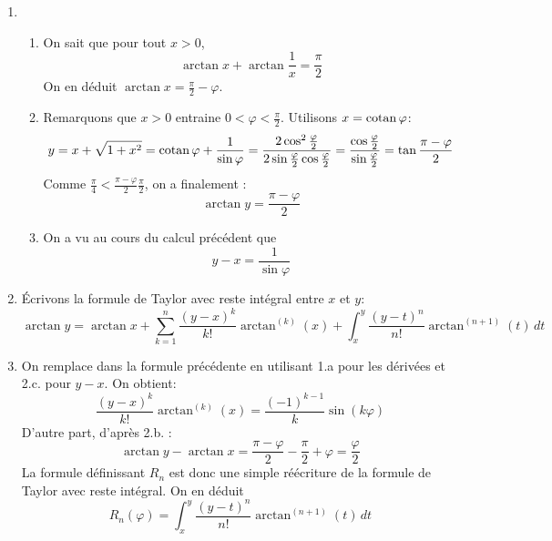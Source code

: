 \begin{enumerate}
\begin{enumerate}
\end{enumerate}
 \item 
\begin{enumerate}
 \item On sait que pour tout $x>0$,
\begin{displaymath}
 \arctan x + \arctan\frac{1}{x}=\frac{\pi}{2}
\end{displaymath}
On en déduit $\arctan x = \frac{\pi}{2}-\varphi$. 
 \item Remarquons que $x>0$ entraine $0< \varphi<\frac{\pi}{2}$. Utilisons $x=\operatorname{cotan} \varphi$:
\begin{displaymath}
 y = x+\sqrt{1+x^2}=\operatorname{cotan} \varphi + \frac{1}{\sin \varphi}
=\frac{2\cos^2\frac{\varphi}{2}}{2\sin\frac{\varphi}{2}\cos\frac{\varphi}{2}}
=\frac{\cos\frac{\varphi}{2}}{\sin\frac{\varphi}{2}}
=\tan \frac{\pi-\varphi}{2}
\end{displaymath}
Comme $\frac{\pi}{4}<\frac{\pi-\varphi}{2}\frac{\pi}{2}$, on a finalement :
\begin{displaymath}
 \arctan y = \frac{\pi-\varphi}{2}
\end{displaymath}

 \item On a vu au cours du calcul précédent que
\begin{displaymath}
 y-x = \frac{1}{\sin \varphi}
\end{displaymath}

\end{enumerate}
  \item \'Ecrivons la formule de Taylor avec reste intégral entre $x$ et $y$:
\begin{displaymath}
 \arctan y = \arctan x + \sum_{k=1}^n \frac{(y-x)^k}{k!}\arctan^{(k)}(x) + \int_x^y\frac{(y-t)^n}{n!}\arctan^{(n+1)}(t)\,dt
\end{displaymath}
 \item On remplace dans la formule précédente en utilisant 1.a pour les dérivées et 2.c. pour $y-x$. On obtient:
\begin{displaymath}
 \frac{(y-x)^k}{k!}\arctan^{(k)}(x)=\frac{(-1)^{k-1}}{k}\sin (k\varphi)
\end{displaymath}
D'autre part, d'après 2.b. :
\begin{displaymath}
 \arctan y - \arctan x= \frac{\pi - \varphi}{2}-\frac{\pi}{2}+\varphi=\frac{\varphi}{2}
\end{displaymath}
La formule définissant $R_n$ est donc une simple réécriture de la formule de Taylor avec reste intégral. On en déduit
 \begin{displaymath}
  R_n(\varphi)= \int_x^y\frac{(y-t)^n}{n!}\arctan^{(n+1)}(t)\,dt
 \end{displaymath}
 

\end{enumerate}
